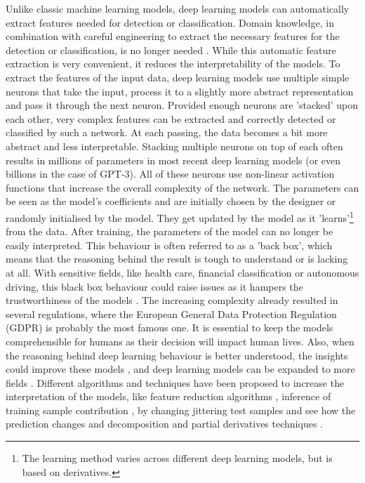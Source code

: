\documentclass{article}
\begin{document}
Unlike classic machine learning models, deep learning models can automatically extract features needed for detection or classification.
Domain knowledge, in combination with careful engineering to extract the necessary features for the detection or classification, is no longer needed \autocite{lecun_deep_2015}.
While this automatic feature extraction is very convenient, it reduces the interpretability of the models.
To extract the features of the input data, deep learning models use multiple simple neurons that take the input, process it to a slightly more abstract representation and pass it through the next neuron.
Provided enough neurons are 'stacked' upon each other, very complex features can be extracted and correctly detected or classified by such a network.
At each passing, the data becomes a bit more abstract and less interpretable.
Stacking multiple neurons on top of each often results in millions of parameters in most recent deep learning models (or even billions in the case of GPT-3).
All of these neurons use non-linear activation functions that increase the overall complexity of the network.
The parameters can be seen as the model's coefficients and are initially chosen by the designer or randomly initialised by the model.
They get updated by the model as it 'learns'\footnote{The learning method varies across different deep learning models, but is based on derivatives.} from the data.
After training, the parameters of the model can no longer be  easily interpreted.
This behaviour is often referred to as a 'back box', which means that the reasoning behind the result is tough to understand or is lacking at all.
With sensitive fields, like health care, financial classification or autonomous driving, this black box behaviour could raise issues as it hampers the trustworthiness of the models \autocite{carvalho_machine_2019}.
The increasing complexity already resulted in several regulations, where the European General Data Protection Regulation (GDPR) is probably the most famous one.
It is essential to keep the models comprehensible for humans as their decision will impact human lives.
Also, when the reasoning behind deep learning behaviour is better understood, the insights could improve these models \autocite{amershi_modeltracker_2015}, and deep learning models can be expanded to more fields \autocite{lei_opening_2018}.
Different algorithms and techniques have been proposed to increase the interpretation of the models, like feature reduction algorithms \autocite{ribeiro_why_2016}, inference of training sample contribution \autocite{koh_understanding_2020}, by changing jittering test samples and see how the prediction changes \autocite{li_understanding_2017} and decomposition and partial derivatives techniques \autocite{samek_explainable_2017}.
\end{document}
